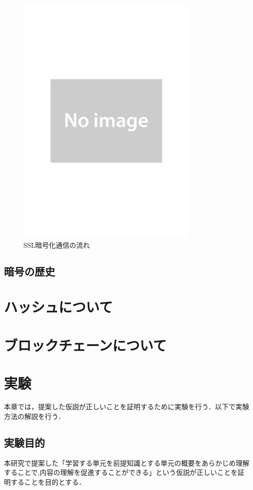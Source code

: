 \documentclass[a4j,12pt]{jsarticle}
\begin{document}
\begin{figure}[H]
\centering
\includegraphics[width=9cm]{noimage.pdf}
\caption{SSL暗号化通信の流れ}
\label{fig:no}
\end{figure} 



\subsection{暗号の歴史}






\newpage
\section{ハッシュについて}

\newpage
\section{ブロックチェーンについて}

\newpage
\section{実験}
本章では，提案した仮説が正しいことを証明するために実験を行う．以下で実験方法の解説を行う．
\subsection{実験目的}
本研究で提案した「学習する単元を前提知識とする単元の概要をあらかじめ理解することで,内容の理解を促進することができる」という仮説が正しいことを証明することを目的とする．
\end{document}
